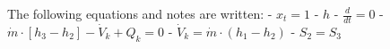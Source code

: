 The following equations and notes are written:  
- \( x_t = 1 \)  
- \( h \)  
- \( \frac{d}{dt} = 0 \)  
- \( \dot{m} \cdot [h_3 - h_2] - \dot{V}_k + Q_k = 0 \)  
- \( \dot{V}_k = \dot{m} \cdot (h_1 - h_2) \)  
- \( S_2 = S_3 \)